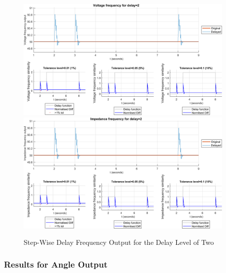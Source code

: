 \begin{figure}
    \caption{Step-Wise Delay Frequency Output for the Delay Level of Two}
    \includegraphics[width=0.95\textwidth]{PMUsim-figures/DelayOf_2/Step_vFrequency.png}    
    \label{fig:PMUsimStep_Two_vFrequency}
    \includegraphics[width=0.95\textwidth]{PMUsim-figures/DelayOf_2/Step_iFrequency.png}    
    \label{fig:PMUsimStep_Two_Frequency}
        \begin{small}
     \end{small}
\end{figure}


\newpage \subsubsection{Results for Angle Output}


